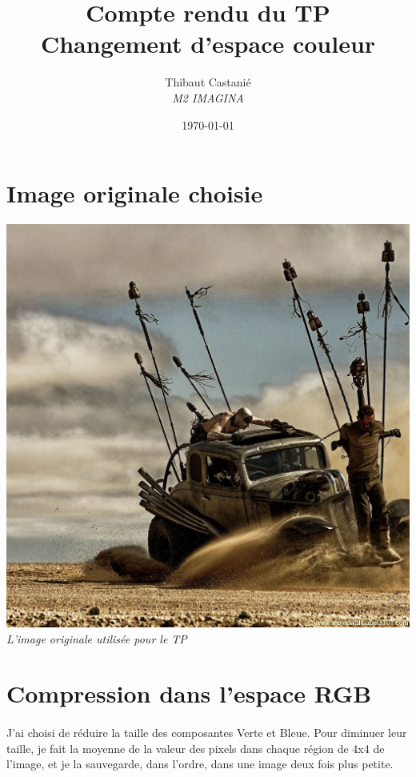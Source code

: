 \documentclass[a4paper,11pt]{article}
\begin{document}
\title{\textbf{Compte rendu du TP }\\Changement d'espace couleur}
\author{Thibaut Castanié\\\textit{M2 IMAGINA}}
\date{\today}

\maketitle
\thispagestyle{empty}

\newpage 

\section{Image originale choisie}

\begin{center}
\includegraphics[scale=0.5]{./imgs/madmax.png}\\
\textit{L'image originale utilisée pour le TP}
\end{center}

\newpage

\section{Compression dans l'espace RGB}
\paragraph{} J'ai choisi de réduire la taille des composantes Verte et Bleue. Pour diminuer leur taille, je fait la moyenne de la valeur des pixels dans chaque région de 4x4 de l'image, et je la sauvegarde, dans l'ordre, dans une image deux fois plus petite.
\end{document}
